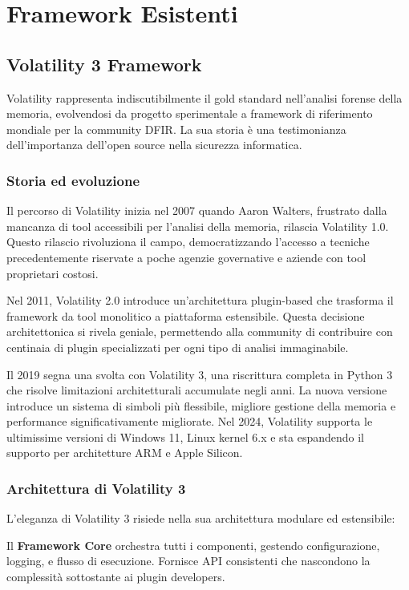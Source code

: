 \section{Framework Esistenti}

\subsection{Volatility 3 Framework}

Volatility \cite{volatility2024} rappresenta indiscutibilmente il gold standard nell'analisi forense della memoria, evolvendosi da progetto sperimentale a framework di riferimento mondiale per la community DFIR. La sua storia è una testimonianza dell'importanza dell'open source nella sicurezza informatica.

\subsubsection{Storia ed evoluzione}
Il percorso di Volatility inizia nel 2007 quando Aaron Walters, frustrato dalla mancanza di tool accessibili per l'analisi della memoria, rilascia Volatility 1.0. Questo rilascio rivoluziona il campo, democratizzando l'accesso a tecniche precedentemente riservate a poche agenzie governative e aziende con tool proprietari costosi.

Nel 2011, Volatility 2.0 introduce un'architettura plugin-based che trasforma il framework da tool monolitico a piattaforma estensibile. Questa decisione architettonica si rivela geniale, permettendo alla community di contribuire con centinaia di plugin specializzati per ogni tipo di analisi immaginabile.

Il 2019 segna una svolta con Volatility 3, una riscrittura completa in Python 3 che risolve limitazioni architetturali accumulate negli anni. La nuova versione introduce un sistema di simboli più flessibile, migliore gestione della memoria e performance significativamente migliorate. Nel 2024, Volatility supporta le ultimissime versioni di Windows 11, Linux kernel 6.x e sta espandendo il supporto per architetture ARM e Apple Silicon.

\subsubsection{Architettura di Volatility 3}
L'eleganza di Volatility 3 risiede nella sua architettura modulare ed estensibile:

Il \textbf{Framework Core} orchestra tutti i componenti, gestendo configurazione, logging, e flusso di esecuzione. Fornisce API consistenti che nascondono la complessità sottostante ai plugin developers.

